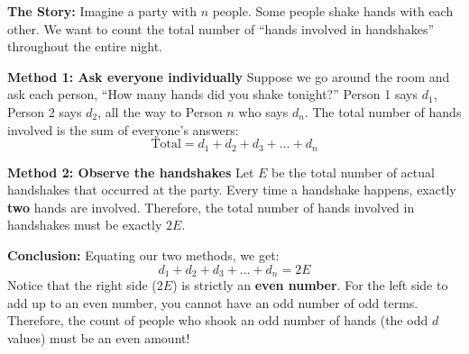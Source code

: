 \documentclass[12pt]{article}
\begin{document}
\textbf{The Story:}
Imagine a party with $n$ people. Some people shake hands with each other. We want to count the total number of ``hands involved in handshakes'' throughout the entire night.

\textbf{Method 1: Ask everyone individually}
Suppose we go around the room and ask each person, ``How many hands did you shake tonight?'' Person 1 says $d_1$, Person 2 says $d_2$, all the way to Person $n$ who says $d_n$.
The total number of hands involved is the sum of everyone's answers:
\[
\text{Total} = d_1 + d_2 + d_3 + \dots + d_n
\]

\textbf{Method 2: Observe the handshakes}
Let $E$ be the total number of actual handshakes that occurred at the party. Every time a handshake happens, exactly \textbf{two} hands are involved. Therefore, the total number of hands involved in handshakes must be exactly $2E$.

\textbf{Conclusion:}
Equating our two methods, we get:
\[
d_1 + d_2 + d_3 + \dots + d_n = 2E
\]
Notice that the right side ($2E$) is strictly an \textbf{even number}. For the left side to add up to an even number, you cannot have an odd number of odd terms. Therefore, the count of people who shook an odd number of hands (the odd $d$ values) must be an even amount!
\end{document}
